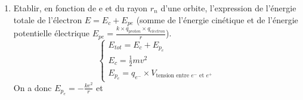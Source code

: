 \documentclass{article}
\begin{document}
\begin{enumerate}
\[    \]
    $\Longrightarrow \frac{1}{m}(mv)^{2} = \frac{ke^{2}}{r}$\newline
    $\Longleftrightarrow \frac{1}{m}\left(\frac{nh}{2\pi r}\right)^{2} = \frac{ke^{2}}{r}$\newline
    $\Longleftrightarrow \frac{1}{m}\frac{n^{2}h^{2}}{4\pi^{2}r_{n}^{2}} = \frac{ke^{2}}{r_{n}}$\newline
    $\Longleftrightarrow r_{n} = \left(\frac{h^{2}}{4\pi^{2}mke^{2}}\right)n^{2}$ avec n$\in\mathbb{N^{*}}$\newline
    On obtient donc
    \[
        r_{n} = \left(\frac{h^{2}}{4\pi^{2}mke^{2}}\right)n^{2}
        \quad
        \begin{varwidth}{\displaywidth}
            \begin{itemize}[nosep]
                \item $r_{n}$: rayon de l'orbite de la n-ième couche atomique
                \item h: constante de Planck (6,62$\times$10$^{-34}$J$\cdot$s)
                \item e: valeur absolue de la charge de l'électron (1,6$\times$10$^{-19}$C)
                \item m: masse de l'électron (9,1$\times$10$^{-31}$kg)
                \item k: constante de Coulomb (9$\times$10$^{-9}$SI)
            \end{itemize}
        \end{varwidth}
    \]
    On pose $a_{0}=r_{1}$ (plus petit rayon des orbites de l'électron, aussi appelé \textit{rayon de Bohr})\newline
    \underline{A.N:} $a_{0} = \frac{h^{2}}{4\pi^{2}mke^{2}} \simeq 5,29\times 10^{11}m$
    \item Etablir, en fonction de e et du rayon $r_{n}$ d'une orbite, l'expression de l'énergie totale de l'électron $E = E_{c} + E_{pe}$ (somme de l'énergie cinétique et de l'énergie potentielle électrique $E_{pe} = \frac{k\times q_{proton}\times q_{electron}}{r}$).\newline
    \[\left\{ \begin{array}{l}
        E_{tot} = E_{c} + E_{p_{e}} \\
        E_{c} = \frac{1}{2}mv^{2} \\
        E_{p_{e}} = q_{e^{-}}\times V_{\text{tension entre $e^{-}$ et $e^{+}$}}
    \end{array}
    \]
    On a donc $E_{p_{e}} = -\frac{ke^{2}}{r}$ et\newline

\end{enumerate}
\end{document}
